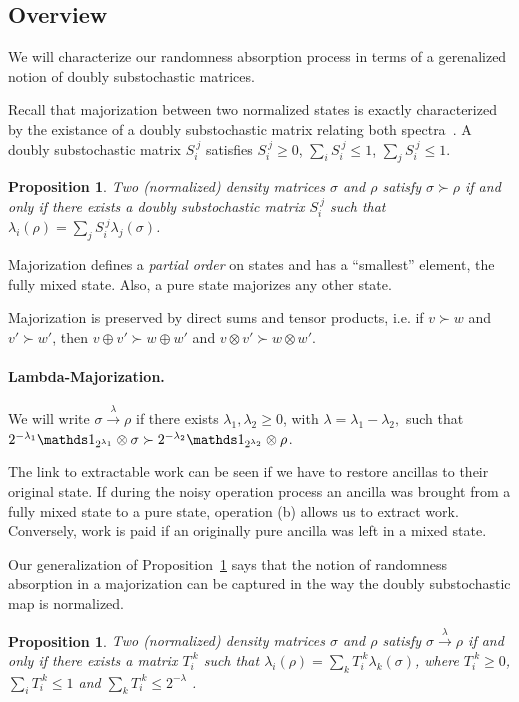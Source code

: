\documentclass[10pt,letterpaper]{article}
\theoremstyle{plain}
\newtheorem{prop}[thm]{Proposition}
\newcommand{\lambdamaj}[1]{\xrightarrow{#1}}
\begin{document}
\subsection{Overview}
We will characterize our randomness absorption process in terms of a gerenalized notion of doubly
substochastic matrices.

Recall that majorization between two normalized states is exactly characterized by the existance of
a doubly substochastic matrix relating both spectra~\cite{BookBhatiaMatrixAnalysis1997}. A doubly
substochastic matrix $S_i^{~j}$ satisfies
$S_i^{~j}\geqslant 0$, $\sum_i S_i^{~j} \leqslant 1$, $\sum_j S_i^{~j} \leqslant 1$.
\begin{prop}
  \label{prop:majorizationDoublyStochMatrix}
  Two (normalized) density matrices $\sigma$ and $\rho$ satisfy $\sigma\succ\rho$ if and only if
  there exists a doubly substochastic matrix $S_i^{~j}$ such that
  $\lambda_i(\rho) = \sum_j S_i^{~j}\lambda_j(\sigma)$.
\end{prop}

Majorization defines a {\em partial order} on states and has a ``smallest'' element, the fully mixed state. Also,
a pure state majorizes any other state.

Majorization is preserved by direct sums and tensor products, i.e. if $v\succ w$ and $v'\succ w'$, then
$v\oplus v' \succ w\oplus w'$ and $v\otimes v' \succ w\otimes w'$.

\paragraph{Lambda-Majorization.} We will write $\sigma\lambdamaj{\lambda}\rho$ if there exists
$\lambda_1,\lambda_2\geqslant 0$, with $\lambda=\lambda_1-\lambda_2,$ such
that $2^{-\lambda_1}\Ident_{2^{\lambda_1}}\otimes\sigma \succ 2^{-\lambda_2}\Ident_{2^{\lambda_2}}\otimes\rho$.

The link to extractable work can be seen if we have to restore ancillas to their original state. If during
the noisy operation process an ancilla was brought from a fully mixed state to a pure state, operation (b)
allows us to extract work. Conversely, work is paid if an originally pure ancilla was left in a mixed
state.

Our generalization of Proposition~\ref{prop:majorizationDoublyStochMatrix} says that the notion of
randomness absorption in a majorization can be captured in
the way the doubly substochastic map is normalized.
\begin{prop}
  \label{prop:LambdaMajTik}
  Two (normalized) density matrices $\sigma$ and $\rho$ satisfy $\sigma\lambdamaj{\lambda}\rho$
  if and only if there exists a matrix $T_i^{~k}$ such that $\lambda_i(\rho) = \sum_k T_i^{~k}\lambda_k(\sigma)$,
  where $T_i^{~k}\geqslant 0$, $\sum_i T_i^{~k} \leqslant 1$ and $\sum_k T_i^{~k} \leqslant 2^{-\lambda}$ .
\end{prop}
\end{document}
